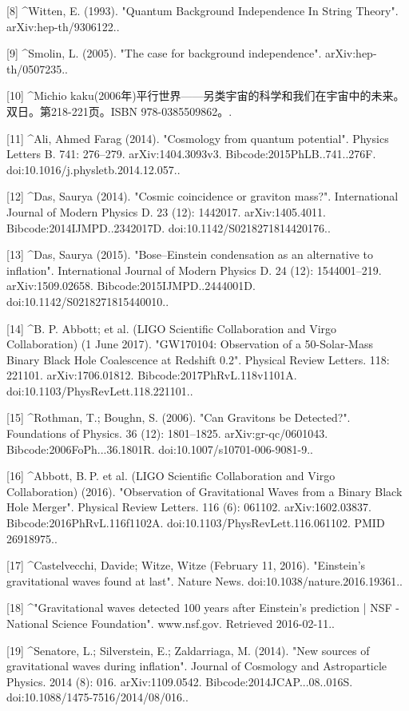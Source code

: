 [8]
^Witten, E. (1993). "Quantum Background Independence In String Theory". arXiv:hep-th/9306122..

[9]
^Smolin, L. (2005). "The case for background independence". arXiv:hep-th/0507235..

[10]
^Michio kaku(2006年)平行世界——另类宇宙的科学和我们在宇宙中的未来。双日。第218-221页。ISBN 978-0385509862。.

[11]
^Ali, Ahmed Farag (2014). "Cosmology from quantum potential". Physics Letters B. 741: 276–279. arXiv:1404.3093v3. Bibcode:2015PhLB..741..276F. doi:10.1016/j.physletb.2014.12.057..

[12]
^Das, Saurya (2014). "Cosmic coincidence or graviton mass?". International Journal of Modern Physics D. 23 (12): 1442017. arXiv:1405.4011. Bibcode:2014IJMPD..2342017D. doi:10.1142/S0218271814420176..

[13]
^Das, Saurya (2015). "Bose–Einstein condensation as an alternative to inflation". International Journal of Modern Physics D. 24 (12): 1544001–219. arXiv:1509.02658. Bibcode:2015IJMPD..2444001D. doi:10.1142/S0218271815440010..

[14]
^B. P. Abbott; et al. (LIGO Scientific Collaboration and Virgo Collaboration) (1 June 2017). "GW170104: Observation of a 50-Solar-Mass Binary Black Hole Coalescence at Redshift 0.2". Physical Review Letters. 118: 221101. arXiv:1706.01812. Bibcode:2017PhRvL.118v1101A. doi:10.1103/PhysRevLett.118.221101..

[15]
^Rothman, T.; Boughn, S. (2006). "Can Gravitons be Detected?". Foundations of Physics. 36 (12): 1801–1825. arXiv:gr-qc/0601043. Bibcode:2006FoPh...36.1801R. doi:10.1007/s10701-006-9081-9..

[16]
^Abbott, B. P. et al. (LIGO Scientific Collaboration and Virgo Collaboration) (2016). "Observation of Gravitational Waves from a Binary Black Hole Merger". Physical Review Letters. 116 (6): 061102. arXiv:1602.03837. Bibcode:2016PhRvL.116f1102A. doi:10.1103/PhysRevLett.116.061102. PMID 26918975..

[17]
^Castelvecchi, Davide; Witze, Witze (February 11, 2016). "Einstein's gravitational waves found at last". Nature News. doi:10.1038/nature.2016.19361..

[18]
^"Gravitational waves detected 100 years after Einstein's prediction | NSF - National Science Foundation". www.nsf.gov. Retrieved 2016-02-11..

[19]
^Senatore, L.; Silverstein, E.; Zaldarriaga, M. (2014). "New sources of gravitational waves during inflation". Journal of Cosmology and Astroparticle Physics. 2014 (8): 016. arXiv:1109.0542. Bibcode:2014JCAP...08..016S. doi:10.1088/1475-7516/2014/08/016..

